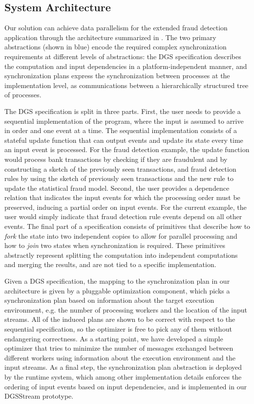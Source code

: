 \subsection{System Architecture}
\label{ssec:solution-architecture}

Our solution can achieve data parallelism for the extended fraud
detection application through the architecture
summarized in .
The two primary abstractions (shown in blue) encode the required complex synchronization requirements at different levels of abstractions:
the DGS specification describes the computation and input dependencies
in a platform-independent manner,
and synchronization plans express the synchronization
between processes at the implementation level,
as communications between a hierarchically structured tree of processes.

The DGS specification is split in three parts.
First, the user
needs to provide a sequential implementation of the program, where the
input is assumed to arrive in order and one event at a time. The
sequential implementation consists of a stateful update function that
can output events and update its state every time an input event is
processed. For the fraud detection example, the update function would
process bank transactions by checking if they are fraudulent and by
constructing a sketch of the previously seen transactions, and fraud
detection rules by using the sketch of previously seen transactions
and the new rule to update the statistical fraud model. Second, the
user provides a dependence relation that indicates the input events
for which the processing order must be preserved, inducing a partial
order on input events. For the current example, the user would simply
indicate that fraud detection rule events depend on all other
events. The final part of a specification consists of primitives that
describe how to \emph{fork} the state into two independent copies to
allow for parallel processing and how to \emph{join} two states when
synchronization is required. These primitives abstractly represent
splitting the computation into independent computations and merging
the results, and are not tied to a specific implementation.

Given a DGS specification,
the mapping to the synchronization plan in our architecture
is given by a pluggable optimization component, which picks
a synchronization plan based on information about the target execution
environment, e.g. the number of processing workers and the location of
the input streams. All of the induced plans are shown to be correct with respect to the sequential specification, so the optimizer is free to pick any of them without endangering correctness. As a starting point, we have developed a simple
optimizer that tries to minimize the number of messages exchanged
between different workers using information about the execution
environment and the input streams.
As a final step, the synchronization plan abstraction
is deployed by the runtime system,
which among other implementation details enforces the ordering of input events based on input dependencies,
and is implemented in our DGSStream prototype.

